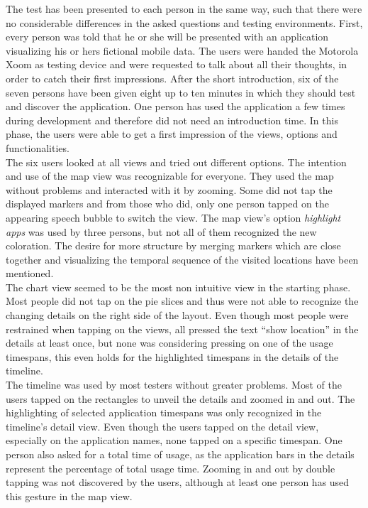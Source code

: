 The  test has been presented to each person in the same way, such that there were no considerable differences in the asked questions and testing environments. First, every person was told that he or she will be presented with an application visualizing his or hers fictional mobile data. The users were handed the Motorola Xoom as testing device and were requested to talk about all their thoughts, in order to catch their first impressions. After the short introduction, six of the seven persons have been given eight up to ten minutes in which they should test and discover the application. One person has used the application a few times during development and therefore did not need an introduction time. In this phase, the users were able to get a first impression of the views, options and functionalities.\\
The  six users looked at all views and tried out different options. The intention and use of the map view was recognizable for everyone. They used the map without problems and interacted with it by zooming. Some did not tap the displayed markers and from those who did, only one person tapped on the appearing speech bubble to switch the view. The map view's option \emph{highlight apps} was used by three persons, but not all of them recognized the new coloration. The desire for more structure by merging markers which are close together and visualizing the temporal sequence of the visited locations have been mentioned.\\
The  chart view seemed to be the most non intuitive view in the starting phase. Most people did not tap on the pie slices and thus were not able to recognize the changing details on the right side of the layout. Even though most people were restrained when tapping on the views, all pressed the text ``show location'' in the details at least once, but none was considering pressing on one of the usage timespans, this even holds for the highlighted timespans in the details of the timeline.\\
The  timeline was used by most testers without greater problems. Most of the users tapped on the rectangles to unveil the details and zoomed in and out. The highlighting of selected application timespans was only recognized in the timeline's detail view. Even though the users tapped on the detail view, especially on the application names, none tapped on a specific timespan. One person also asked for a total time of usage, as the application bars in the details represent the percentage of total usage time. Zooming in and out by double tapping was not discovered by the users, although at least one person has used this gesture in the map view.\\
